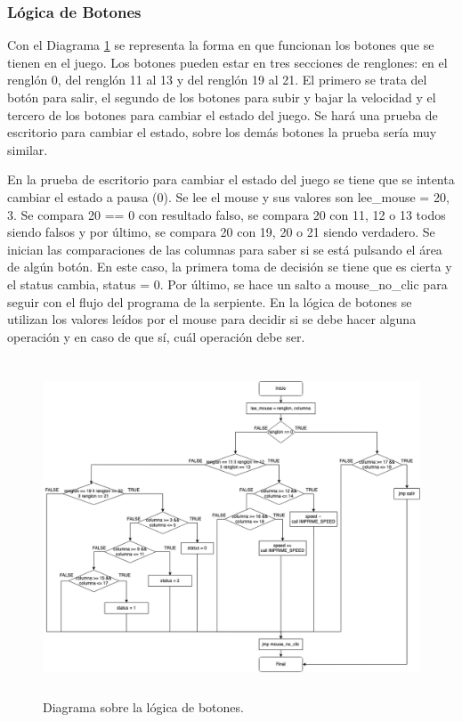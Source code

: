 \documentclass[12pt]{article}
\begin{document}
\subsubsection*{Lógica de Botones}
Con el Diagrama \ref{fig:botones} se representa la forma en que funcionan los botones que se tienen en el juego. Los botones pueden estar en tres secciones de renglones: en el renglón 0, del renglón 11 al 13 y del renglón 19 al 21. El primero se trata del botón para salir, el segundo de los botones para subir y bajar la velocidad y el tercero de los botones para cambiar el estado del juego. Se hará una prueba de escritorio para cambiar el estado, sobre los demás botones la prueba sería muy similar.

En la prueba de escritorio para cambiar el estado del juego se tiene que se intenta cambiar el estado a pausa (0). Se lee el mouse y sus valores son lee\_mouse = 20, 3. Se compara 20 == 0 con resultado falso, se compara 20 con 11, 12 o 13 todos siendo falsos y por último, se compara 20 con 19, 20 o 21 siendo verdadero. Se inician las comparaciones de las columnas para saber si se está pulsando el área de algún botón. En este caso, la primera toma de decisión se tiene que es cierta y el status cambia, status = 0. Por último, se hace un salto a mouse\_no\_clic para seguir con el flujo del programa de la serpiente. En la lógica de botones se utilizan los valores leídos por el mouse para decidir si se debe hacer alguna operación y en caso de que sí, cuál operación debe ser.

\begin{figure}
    \centering
    \includegraphics[height= 10cm]{img/diagramas/05DiagramaBotones.png}
    \caption{Diagrama sobre la lógica de botones.}
    \label{fig:botones}
\end{figure}
\end{document}
